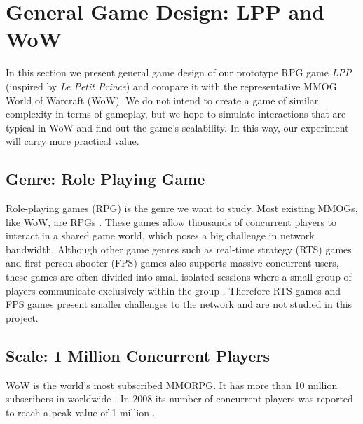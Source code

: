 \documentclass{article}
\begin{document}
\section{General Game Design: LPP and WoW}
\label{ggd}
In this section we present general game design of our prototype RPG game \emph{LPP} (inspired by \emph{Le Petit Prince}) and compare it with the representative MMOG World of Warcraft (WoW). We do not intend to create a game of similar complexity in terms of gameplay, but we hope to simulate interactions that are typical in WoW and find out the game's scalability. In this way, our experiment will carry more practical value.

\subsection{Genre: Role Playing Game}
Role-playing games (RPG) is the genre we want to study. Most existing MMOGs, like WoW, are RPGs \cite{Knutsson04}. These games allow thousands of concurrent players to interact in a shared game world, which poses a big challenge in network bandwidth. Although other game genres such as real-time strategy (RTS) games and first-person shooter (FPS) games also supports massive concurrent users, these games are often divided into small isolated sessions where a small group of players communicate exclusively within the group \cite{Knutsson04}. Therefore RTS games and FPS games present smaller challenges to the network and are not studied in this project.

\subsection{Scale: 1 Million Concurrent Players}
WoW is the world's most subscribed MMORPG. It has more than 10 million subscribers in worldwide \cite{wow12, Schiano11}. In 2008 its number of concurrent players was reported to reach a peak value of 1 million \cite{wow08}. 

\end{document}
